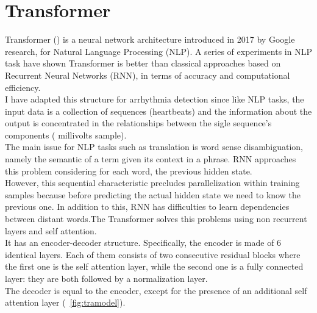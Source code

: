 \documentclass[LaM,binding=0.6cm]{sapthesis}
\begin{document}
\section{Transformer}
Transformer (\cite{aiayn}) is a neural network architecture introduced in 2017 by Google research, for Natural Language Processing (NLP). A series of experiments in NLP task have shown Transformer is better than classical approaches based on Recurrent Neural Networks (RNN), in terms of accuracy and computational efficiency.\\I have adapted this structure for arrhythmia detection since like NLP tasks, the input data is a collection of sequences  (heartbeats) and the information about the output is concentrated in the relationships between the sigle sequence's components ( millivolts sample).\\The main issue for NLP tasks such as translation is word sense disambiguation, namely the semantic of a term given its context in a phrase. RNN approaches this problem considering for each word, the previous hidden state.\\However, this sequential characteristic precludes parallelization within training samples because before predicting the actual hidden state we need to know the previous one. In addition to this, RNN has difficulties to learn dependencies between distant words.The Transformer solves this problems using non recurrent layers and self attention.\\It has an encoder-decoder structure. Specifically, the encoder is made of 6 identical layers. Each of them consists of two consecutive residual blocks where the first one is the self attention layer, while the second one is a fully connected layer: they are both followed by a normalization layer.\\The decoder is equal to the encoder, except for the presence of an additional self attention layer (~\ref{fig:tramodel}).
\end{document}
